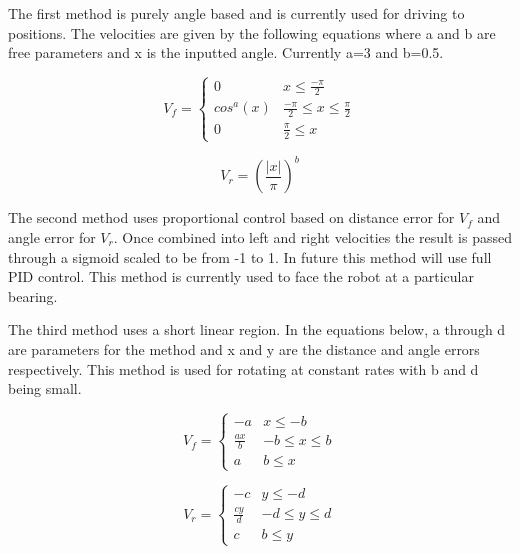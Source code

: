 The first method is purely angle based and is currently used for driving to positions. The velocities are given by the following equations where a and b are free parameters and x is the inputted angle. Currently a=3 and b=0.5.

\begin{equation}
    V_f =
    \begin{cases}
      0 & x\leq \frac{-\pi}{2} \\
      cos^a(x) & \frac{-\pi}{2} \leq x\leq \frac{\pi}{2} \\
      0 & \frac{\pi}{2} \leq x
   \end{cases}
\end{equation}

\begin{equation}
    V_r = (\frac{|x|}{\pi})^b
\end{equation}

The second method uses proportional control based on distance error for $V_f$ and angle error for $V_r$. Once combined into left and right velocities the result is passed through a sigmoid scaled to be from -1 to 1. In future this method will use full PID control. This method is currently used to face the robot at a particular bearing.

The third method uses a short linear region. In the equations below, a through d are parameters for the method and x and y are the distance and angle errors respectively. This method is used for rotating at constant rates with b and d being small.

\begin{equation}
    V_f =
    \begin{cases}
      -a & x\leq -b \\
      \frac{ax}{b} & -b \leq x\leq b \\
      a & b \leq x
   \end{cases}
\end{equation}

\begin{equation}
    V_r =
    \begin{cases}
      -c & y \leq -d \\
      \frac{cy}{d} & -d \leq y \leq d \\
      c & b \leq y
   \end{cases}
\end{equation}


